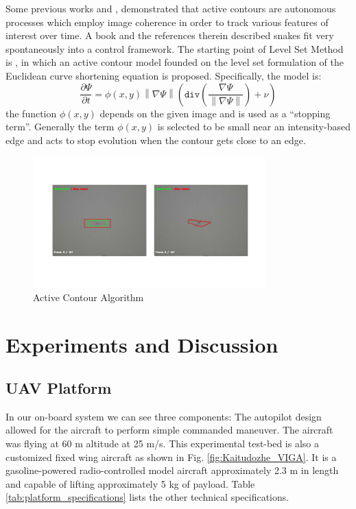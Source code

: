 Some previous works \cite{betser2004automatic} and \cite{sattigeri2007vision}, demonstrated that active contours are autonomous processes which employ image coherence in order to track various features of interest over time. A book \cite{blake1998active}and the references therein described snakes fit very spontaneously into a control framework. The starting point of Level Set Method is  \cite{368173}, \cite{Caselles1993} in which an active contour model founded on the level set formulation of the Euclidean curve shortening equation is proposed. Specifically, the model is:
\begin{equation} \label{eq:BasicModel}
\frac{\partial \Psi}{\partial t} = \phi(x,y) \left\|\nabla\Psi\right\| (\texttt{div}(\frac{\nabla \Psi}{\left\|\nabla\Psi\right\|})+\nu) 
\end{equation}
the function $ \phi(x,y) $ depends on the given image and is used as a ``stopping term''. Generally the term  $ \phi(x,y) $ is selected to be small near an intensity-based edge and acts to stop evolution when the contour gets close to an edge.

\begin{figure}[!th]
	\centering
	\includegraphics[width=0.8\textwidth]{Figs/chp04_07_active_contour_demo.pdf}
	\caption{Active Contour Algorithm}
	\label{fig:chp04_07_active_contour_demo}    
\end{figure}





\section{Experiments and Discussion}
\subsection{UAV Platform}
In our on-board system we can see three components: The autopilot design allowed for the aircraft to perform simple commanded maneuver. The aircraft was flying at 60 m altitude at 25 m/s. This experimental test-bed is also a customized fixed wing aircraft as shown in Fig. \ref{fig:Kaitudozhe_VIGA}. It is a gasoline-powered radio-controlled model aircraft approximately 2.3 m in length and capable of lifting approximately 5 kg of payload. Table \ref{tab:platform_specifications} lists the other technical specifications.

